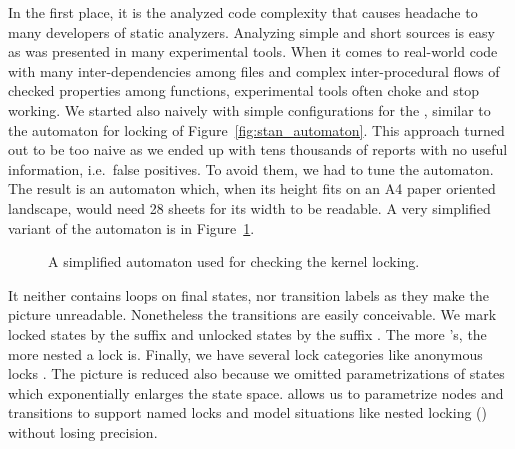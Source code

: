 In the first place, it is the analyzed code complexity that causes headache to
many developers of static analyzers. Analyzing simple and short sources is
easy as was presented in many experimental tools. When it comes to real-world
code with many inter-dependencies among files and complex inter-procedural
flows of checked properties among functions, experimental tools often choke
and stop working.  We started also naively with simple configurations for the
\AC, similar to the automaton for locking of Figure~\ref{fig:stan_automaton}.
This approach turned out to be too naive as we ended up with tens thousands of
reports with no useful information, i.e.\ false positives. To avoid them, we
had to tune the automaton. The result is an automaton which, when its height
fits on an A4 paper oriented landscape, would need 28 sheets for its width to
be readable. A very simplified variant of the automaton is in
Figure~\ref{fig:stan_big_automaton}.
\begin{figure}[htb]
  \begin{center}
  
  \end{center}
    \caption{A simplified automaton used for checking the kernel locking.}
    \label{fig:stan_big_automaton}
\end{figure}
It neither contains loops on final states, nor transition labels as they make
the picture unreadable. Nonetheless the transitions are easily conceivable. We
mark locked states by the suffix  and unlocked states by the suffix
. The more 's, the more nested a lock is. Finally, we have
several lock categories like anonymous locks . The picture is reduced
also because we omitted parametrizations of states which exponentially
enlarges the state space. \stan allows us to parametrize nodes and transitions
to support named locks and model situations like nested locking
() without losing precision.

